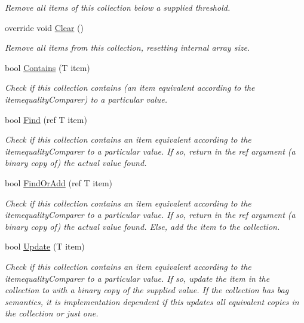 \begin{DoxyCompactItemize}
\begin{DoxyCompactList}\small\item\em Remove all items of this collection below a supplied threshold. \end{DoxyCompactList}\item 
override void \hyperlink{class_c5_1_1_sorted_array_ae316e2061d7224288fefe5cc3a848935}{Clear} ()
\begin{DoxyCompactList}\small\item\em Remove all items from this collection, resetting internal array size. \end{DoxyCompactList}\item 
bool \hyperlink{class_c5_1_1_sorted_array_a3b50cf0032570c401d576f32104f68aa}{Contains} (T item)
\begin{DoxyCompactList}\small\item\em Check if this collection contains (an item equivalent according to the itemequality\+Comparer) to a particular value. \end{DoxyCompactList}\item 
bool \hyperlink{class_c5_1_1_sorted_array_afa6a8770273981e3641d7d13edd0f39b}{Find} (ref T item)
\begin{DoxyCompactList}\small\item\em Check if this collection contains an item equivalent according to the itemequality\+Comparer to a particular value. If so, return in the ref argument (a binary copy of) the actual value found. \end{DoxyCompactList}\item 
bool \hyperlink{class_c5_1_1_sorted_array_ac7f5931e6681c9bfe5a1dabb9a326c8e}{Find\+Or\+Add} (ref T item)
\begin{DoxyCompactList}\small\item\em Check if this collection contains an item equivalent according to the itemequality\+Comparer to a particular value. If so, return in the ref argument (a binary copy of) the actual value found. Else, add the item to the collection. \end{DoxyCompactList}\item 
bool \hyperlink{class_c5_1_1_sorted_array_a4283f8b55f0afa4e594395195e477a98}{Update} (T item)
\begin{DoxyCompactList}\small\item\em Check if this collection contains an item equivalent according to the itemequality\+Comparer to a particular value. If so, update the item in the collection to with a binary copy of the supplied value. If the collection has bag semantics, it is implementation dependent if this updates all equivalent copies in the collection or just one. \end{DoxyCompactList}\item 

\end{DoxyCompactItemize}
